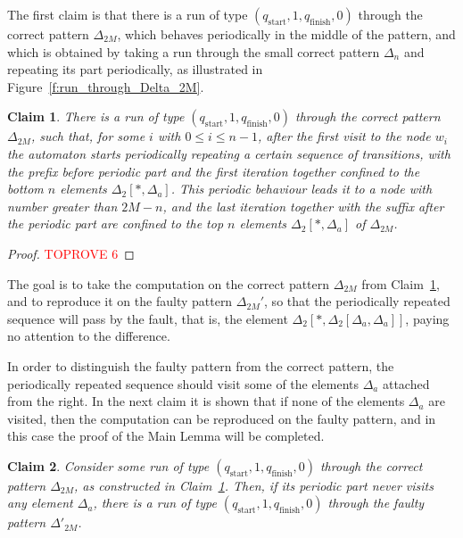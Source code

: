 \documentclass[12pt,a4paper]{article}
\newtheorem{claim}{Claim}
\theoremstyle{definition}
\begin{document}
The first claim is that there is a run of type $(q_{\text{start}},1,q_{\text{finish}},0)$
through the correct pattern $\Delta_{2M}$,
which behaves periodically in the middle of the pattern,
and which is obtained by taking a run
through the small correct pattern $\Delta_n$
and repeating its part periodically,
as illustrated in Figure~\ref{f:run_through_Delta_2M}.

\begin{claim}\label{claim_run_Delta_2M_from_w_to_w}
There is a run of type $(q_{\text{start}},1,q_{\text{finish}},0)$
through the correct pattern $\Delta_{2M}$,
such that, for some $i$ with $0 \leqslant i \leqslant n-1$, after the first visit to the node $w_i$
the automaton starts periodically repeating a certain sequence of transitions,
with the prefix before periodic part and the first iteration together
confined to the bottom $n$ elements $\Delta_2[*,\Delta_a]$.
This periodic behaviour leads it to a node with number greater than $2M-n$,
and the last iteration together with the suffix after the periodic part
are confined to the top $n$ elements $\Delta_2[*,\Delta_a]$ of $\Delta_{2M}$.
\end{claim}
\begin{proof}\textcolor{red}{TOPROVE 6}\end{proof}

The goal is to take the computation on the correct pattern $\Delta_{2M}$
from Claim~\ref{claim_run_Delta_2M_from_w_to_w},
and to reproduce it on the faulty pattern $\Delta_{2M}'$,
so that the periodically repeated sequence will pass by the fault,
that is, the element $\Delta_2[*,\Delta_2[\Delta_a,\Delta_a]]$,
paying no attention to the difference.

In order to distinguish the faulty pattern from the correct pattern,
the periodically repeated sequence
should visit some of the elements $\Delta_a$ attached from the right.
In the next claim it is shown that if none of the elements $\Delta_a$ are visited,
then the computation can be reproduced on the faulty pattern,
and in this case the proof of the Main Lemma will be completed.

\begin{claim}\label{claim_run_Delta_2M_from_w_to_w_never_visiting_Delta_a}
Consider some run of type $(q_{\text{start}},1,q_{\text{finish}},0)$
through the correct pattern $\Delta_{2M}$,
as constructed in Claim~\ref{claim_run_Delta_2M_from_w_to_w}.
Then, if its periodic part never visits any element $\Delta_a$,
there is a run of type $(q_{\text{start}},1,q_{\text{finish}},0)$
through the faulty pattern $\Delta'_{2M}$.
\end{claim}
\end{document}
